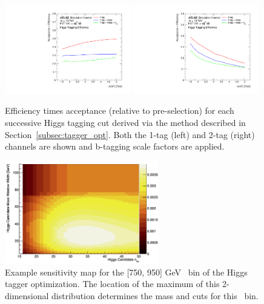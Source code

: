 \begin{figure}[htbp!]
\begin{center}
    \includegraphics[width=0.49\textwidth]{VHqqbb_HiggsTaggingEff_1tag.pdf}
    \includegraphics[width=0.49\textwidth]{VHqqbb_HiggsTaggingEff_2tag.pdf}
\end{center}
\caption{Efficiency times acceptance (relative to pre-selection) for each successive Higgs tagging cut derived via the method described in Section~\ref{subsec:tagger_opt}. Both the 1-tag (left) and 2-tag (right) channels are shown and b-tagging scale factors are applied.}
\label{fig:higgs_tagger_eff}
\end{figure}

\begin{figure}[htbp!]
\begin{center}
    \includegraphics[width=0.6\textwidth]{VHqqbb_HiggsOpSens_pT750to900GeV.png}
\end{center}
\caption{Example sensitivity map for the [750, 950] GeV \pt\ bin of the Higgs tagger optimization. The location of the maximum of this 2-dimensional distribution determines the mass and \ntrk cuts for this \pt\ bin.}
\label{fig:higgs_opt_sens}
\end{figure}

